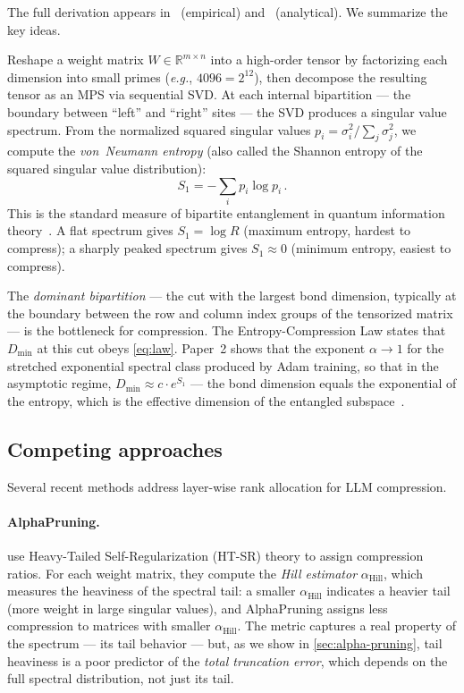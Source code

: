 \documentclass[11pt,a4paper]{article}
\newcommand{\Dmin}{D_{\min}}
\newcommand{\Svn}{S_1}
\newcommand{\eg}{\textit{e.g.}}
\begin{document}
The full derivation appears in~\citet{calderon2026cartography}
(empirical) and~\citet{calderon2026theory} (analytical).  We
summarize the key ideas.

Reshape a weight matrix $W \in \mathbb{R}^{m \times n}$ into a
high-order tensor by factorizing each dimension into small primes
(\eg, $4096 = 2^{12}$), then decompose the resulting tensor as
an MPS via sequential SVD.  At each internal bipartition --- the
boundary between ``left'' and ``right'' sites --- the SVD produces
a singular value spectrum.  From the normalized squared singular
values $p_i = \sigma_i^2 / \sum_j \sigma_j^2$, we compute the
\emph{von~Neumann entropy} (also called the Shannon entropy of the
squared singular value distribution):
\begin{equation}
  \label{eq:svn}
  \Svn = -\sum_i p_i \log p_i\,.
\end{equation}
This is the standard measure of bipartite entanglement in quantum
information theory~\citep{VonNeumann1932, Eisert2010}.  A flat
spectrum gives $\Svn = \log R$ (maximum entropy, hardest to
compress); a sharply peaked spectrum gives $\Svn \approx 0$ (minimum
entropy, easiest to compress).

The \emph{dominant bipartition} --- the cut with the largest bond
dimension, typically at the boundary between the row and column index
groups of the tensorized matrix --- is the bottleneck for
compression.  The Entropy-Compression Law states that $\Dmin$ at this
cut obeys \cref{eq:law}.  Paper~2 shows that the exponent
$\alpha \to 1$ for the stretched exponential spectral class produced
by Adam training, so that in the asymptotic regime,
$\Dmin \approx c \cdot e^{\Svn}$ --- the bond dimension equals the
exponential of the entropy, which is the effective dimension of the
entangled subspace~\citep{calderon2026theory}.

\subsection{Competing approaches}
\label{sec:bg-competing}

Several recent methods address layer-wise rank allocation for LLM
compression.

\paragraph{AlphaPruning.}
\citet{lu2024alphapruning} use Heavy-Tailed Self-Regularization
(HT-SR) theory to assign compression ratios.  For each weight
matrix, they compute the \emph{Hill estimator}
$\alpha_{\text{Hill}}$, which measures the heaviness of the spectral
tail: a smaller $\alpha_{\text{Hill}}$ indicates a heavier tail (more
weight in large singular values), and AlphaPruning assigns less
compression to matrices with smaller $\alpha_{\text{Hill}}$.  The
metric captures a real property of the spectrum --- its tail behavior
--- but, as we show in \cref{sec:alpha-pruning}, tail heaviness is a
poor predictor of the \emph{total truncation error}, which depends on
the full spectral distribution, not just its tail.
\end{document}
